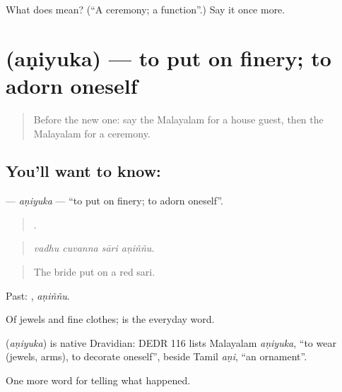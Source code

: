 \begin{tcolorbox}[breakable,colback=teal!4,colframe=teal!35!black,title={Before you move on}]
What does  mean? (\textquotedblleft{}A ceremony; a function\textquotedblright{}.) Say it once more.
\end{tcolorbox}
\section[\texorpdfstring{\ml{അണിയുക} (aṇiyuka)}{അണിയുക (aṇiyuka)}]{ (aṇiyuka) — to put on finery; to adorn oneself}

\label{lesson:ML-C387-aniyuka}



\begin{quote}
Before the new one: say the Malayalam for a house guest, then the Malayalam for a ceremony.
\end{quote}

\subsection*{You'll want to know: }
\textbf{} — \emph{aṇiyuka} — \textquotedblleft{}to put on finery; to adorn oneself\textquotedblright{}.

\begin{quote}
   .
\end{quote}

\begin{quote}
\emph{vadhu cuvanna sāri aṇiññu.}
\end{quote}

\begin{quote}
The bride put on a red sari.
\end{quote}

Past: , \emph{aṇiññu}.

Of jewels and fine clothes;  is the everyday word.

\begin{cousinweb}
\textbf{} (\emph{aṇiyuka}) is native Dravidian: DEDR 116 lists Malayalam \emph{aṇiyuka}, \textquotedblleft{}to wear (jewels, arms), to decorate oneself\textquotedblright{}, beside Tamil \emph{aṇi}, \textquotedblleft{}an ornament\textquotedblright{}.
\end{cousinweb}

\begin{grammarlens}[title={What you've built}]
One more word for telling what happened.
\end{grammarlens}

